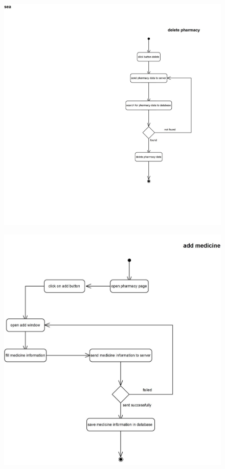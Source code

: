 \documentclass[]{article}
\begin{document}
\begin{figure}[H]
\centering
\includegraphics[scale=0.4]{./activity/16}
\end{figure}
\begin{figure}[H]
\centering
\includegraphics[scale=0.6]{./activity/17}
\end{figure}
\end{document}

